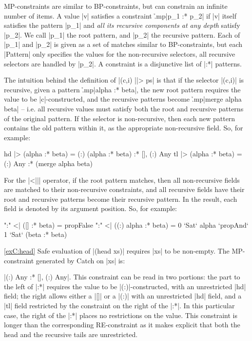 MP-constraints are similar to BP-constraints, but can constrain an infinite number of items. A value |v| satisfies a constraint \h{.mp}|p_1 :* p_2| if |v| itself satisfies the pattern |p_1| and \textit{all its recursive components at any depth} satisfy |p_2|. We call |p_1| the root pattern, and |p_2| the recursive pattern. Each of |p_1| and |p_2| is given as a set of matches similar to BP-constraints, but each |Pattern| only specifies the values for the non-recursive selectors, all recursive selectors are handled by |p_2|. A constraint is a disjunctive list of |:*| patterns.

The intuition behind the definition of |(c,i) ||> ps| is that if the selector |(c,i)| is recursive, given a pattern \h{.mp}|alpha :* beta|, the new root pattern requires the value to be |c|-constructed, and the recursive patterns become \h{.mp}|merge alpha beta| -- i.e. all recursive values must satisfy both the root and recursive patterns of the original pattern. If the selector is non-recursive, then each new pattern contains the old pattern within it, as the appropriate non-recursive field. So, for example:

\ignore\begin{code}
hd  |> (alpha :* beta) = {(:) (alpha :* beta)  } :* {[], (:) Any}
tl  |> (alpha :* beta) = {(:) Any              } :* (merge alpha beta)
\end{code}

For the |<||| operator, if the root pattern matches, then all non-recursive fields are matched to their non-recursive constraints, and all recursive fields have their root and recursive patterns become their recursive pattern. In the result, each field is denoted by its argument position. So, for example:

\ignore\begin{code}
":" <| ({[]         } :* beta) = propFalse
":" <| ({(:) alpha  } :* beta) = 0 `Sat` alpha `propAnd` 1 `Sat` (beta :* beta)
\end{code}

\begin{examplerevisit}{\ref{exC:head}} Safe evaluation of |(head xs)| requires |xs| to be non-empty. The MP-constraint generated by Catch on |xs| is: \ignore|{(:) Any} :* {[], (:) Any}|. This constraint can be read in two portions: the part to the left of |:*| requires the value to be |(:)|-constructed, with an unrestricted |hd| field; the right allows either a |[]| or a |(:)| with an unrestricted |hd| field, and a |tl| field restricted by the constraint on the right of the |:*|. In this particular case, the right of the |:*| places no restrictions on the value. This constraint is longer than the corresponding RE-constraint as it makes explicit that both the head and the recursive tails are unrestricted.
\end{examplerevisit}

